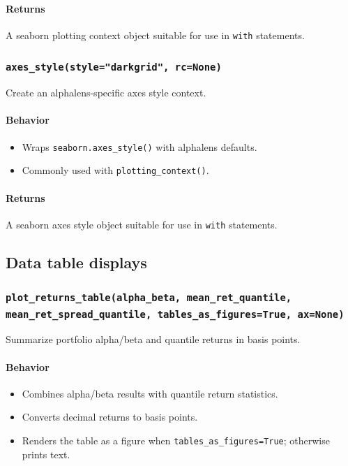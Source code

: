 \documentclass[11pt]{article}
\begin{document}
\paragraph{Returns}
A seaborn plotting context object suitable for use in \texttt{with} statements.

\subsubsection{\texttt{axes\_style(style="darkgrid", rc=None)}}
Create an alphalens-specific axes style context.

\paragraph{Behavior}
\begin{itemize}
  \item Wraps \texttt{seaborn.axes\_style()} with alphalens defaults.
  \item Commonly used with \texttt{plotting\_context()}.
\end{itemize}

\paragraph{Returns}
A seaborn axes style object suitable for use in \texttt{with} statements.

\subsection{Data table displays}

\subsubsection{\texttt{plot\_returns\_table(alpha\_beta, mean\_ret\_quantile, mean\_ret\_spread\_quantile, tables\_as\_figures=True, ax=None)}}
Summarize portfolio alpha/beta and quantile returns in basis points.

\paragraph{Behavior}
\begin{itemize}
  \item Combines alpha/beta results with quantile return statistics.
  \item Converts decimal returns to basis points.
  \item Renders the table as a figure when \texttt{tables\_as\_figures=True}; otherwise prints text.
\end{itemize}
\end{document}
